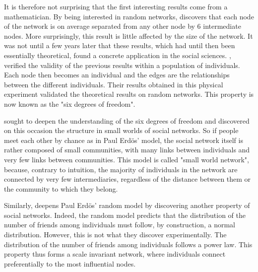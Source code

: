 It is therefore not surprising that the first interesting results come from a mathematician.
By being interested in random networks, \cite{erdosEvolutionRandomGraphs1960} discovers that each node of the network is on average separated from any other node by 6 intermediate nodes.
More surprisingly, this result is little affected by the size of the network.
It was not until a few years later that these results, which had until then been essentially theoretical, found a concrete application in the social sciences.
\cite{milgramSmallWorldProblem1967}, verified the validity of the previous results within a population of individuals.
Each node then becomes an individual and the edges are the relationships between the different individuals.
Their results obtained in this physical experiment validated the theoretical results on random networks.
This property is now known as the "six degrees of freedom".

\cite{wattsCollectiveDynamicsSmallworld1998} sought to deepen the understanding of the six degrees of freedom and discovered on this occasion the structure in small worlds of social networks.
So if people meet each other by chance as in Paul Erdös' model, the social network itself is rather composed of small communities, with many links between individuals
and very few links between communities.
This model is called "small world network", because, contrary to intuition, the majority of individuals in the network are connected by very few intermediaries, regardless of the distance between them or the community to which they belong.

Similarly, \cite{barabasiEmergenceScalingRandom1999} deepens Paul Erdös' random model by discovering another property of social networks.
Indeed, the random model predicts that the distribution of the number of friends among individuals must follow, by construction, a normal distribution.
However, this is not what they discover experimentally.
The distribution of the number of friends among individuals follows a power law.
This property thus forms a scale invariant network, where individuals connect preferentially to the most influential nodes.

